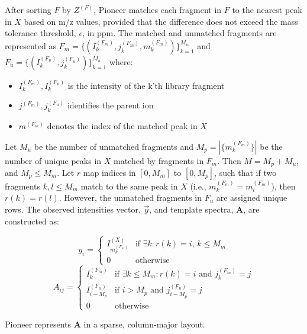\documentclass[pdflatex,sn-nature]{sn-jnl}
\begin{document}
After sorting $F$ by $Z^{(F)}$, Pioneer matches each fragment in $F$ to the nearest peak in $X$ based on m/z values, provided that the difference does not exceed the mass tolerance threshold, $\epsilon$, in ppm. The matched and unmatched fragments are represented as $F_{m} = \{(I_k^{(F_{m})}, j_k^{(F_{m})}, m_k^{(F_{m})})\}_{k=1}^{M_{m}}$ and $F_{u} = \{(I_k^{(F_{u})}, j_k^{(F_{u})})\}_{k=1}^{M_{u}}$ where:
\begin{itemize}
\item $I_k^{(F_{m})}, I_k^{(F_{u})}$ is the intensity of the k'th library fragment
\item $j^{(F_{m})}, j_k^{(F_{u})}$ identifies the parent ion
\item $m^{(F_{m})}$ denotes the index of the matched peak in $X$
\end{itemize}

Let $M_u$ be the number of unmatched fragments and $M_p =  \left|\{m_k^{(F_m)}\}\right|$ be the number of unique peaks in $X$ matched by fragments in $F_m$. Then $M = M_p + M_u$, and $M_p \leq M_m$. Let $r$ map indices in $[0, M_m]$ to $[0, M_p]$, such that if two fragments $k,l\leq M_m$ match to the same peak in $X$ (i.e., $m_k^{(F_m)} = m_l^{(F_m)}$), then $r(k) = r(l)$. However, the unmatched fragments in $F_u$ are assigned unique rows. The observed intensities vector, $\vec{y}$, and template spectra, $\mathbf{A}$, are constructed as:


\begin{equation}
y_i =
\begin{cases}
I_{m_k^{(F_m)}}^{(X)} & \text{if } \exists k: r(k) = i \text{, } k \leq M_{m}\\
0 & \text{otherwise}
\end{cases}
\end{equation}
\begin{equation}
A_{ij} =
\begin{cases}
I_{k}^{(F_{m})} & \text{if } \exists k \leq M_m : r(k) = i \text{ and } j_k^{(F_m)} = j \\
I_{i - M_{p}}^{(F_{u})} & \text{if } i > M_{p} \text{ and } j_{i - M_{p}}^{(F_u)} = j \\
0 & \text{otherwise}
\end{cases}
\end{equation}

Pioneer represents $\mathbf{A}$ in a sparse, column-major layout.


\end{document}
